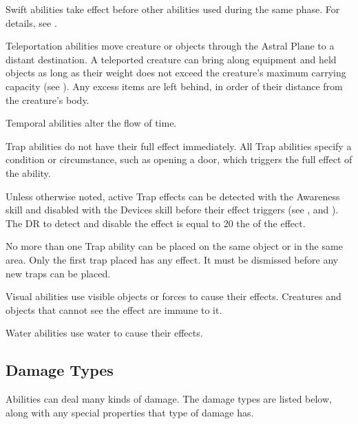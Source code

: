          Swift abilities take effect before other abilities used during the same phase.
        For details, see .

         Teleportation abilities move creature or objects through the Astral Plane to a distant destination.
        A teleported creature can bring along equipment and held objects as long as their weight does not exceed the creature's maximum carrying capacity (see ). Any excess items are left behind, in order of their distance from the creature's body.

         Temporal abilities alter the flow of time.

         Trap abilities do not have their full effect immediately.
        All Trap abilities specify a condition or circumstance, such as opening a door, which triggers the full effect of the ability.
        \par Unless otherwise noted, active Trap effects can be detected with the Awareness skill and disabled with the Devices skill before their effect triggers (see , and ).
        The DR to detect and disable the effect is equal to 20 \add the  of the effect.
        \par No more than one Trap ability can be placed on the same object or in the same area.
        Only the first trap placed has any effect.
        It must be dismissed before any new traps can be placed.

         Visual abilities use visible objects or forces to cause their effects.
        Creatures and objects that cannot see the effect are immune to it.

         Water abilities use water to cause their effects.

    \subsection{Damage Types}\label{Damage Types}
        Abilities can deal many kinds of damage.
        The damage types are listed below, along with any special properties that type of damage has.

